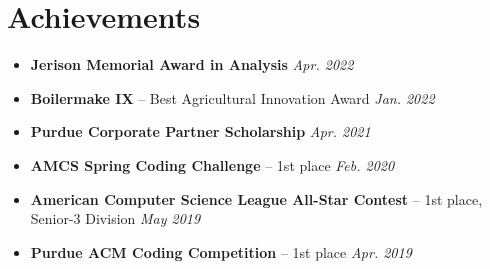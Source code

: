 \documentclass[11pt,letterpaper]{article}
\newcommand{\resumeItemListStart}{
    \begin{itemize}[itemsep=1pt, parsep=0pt, topsep=0pt]
}
\newcommand{\resumeItemListEnd}{
    \end{itemize}
}
\begin{document}
\section{Achievements}

\resumeItemListStart
    \item \textbf{Jerison Memorial Award in Analysis} \hfill \textit{Apr. 2022}
    \item \textbf{Boilermake IX} -- Best Agricultural Innovation Award \hfill \textit{Jan. 2022}
    \item \textbf{Purdue Corporate Partner Scholarship} \hfill \textit{Apr. 2021}
	\item \textbf{AMCS Spring Coding Challenge} -- 1st place \hfill \textit{Feb. 2020}
	\item \textbf{American Computer Science League All-Star Contest} -- 1st place, Senior-3 Division \hfill \textit{May 2019}
	\item \textbf{Purdue ACM Coding Competition} -- 1st place \hfill \textit{Apr. 2019}
\resumeItemListEnd
	
\end{document}
